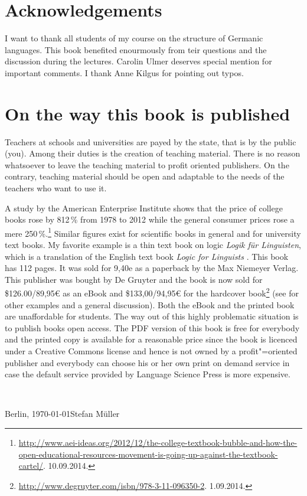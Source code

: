 \section*{Acknowledgements}

I want to thank all students of my course on the structure of Germanic languages. This book
benefited enourmously from teir questions and the discussion during the lectures. 
Carolin Ulmer %
deserves special mention for important comments. I thank Anne
Kilgus for pointing out typos.


\section*{On the way this book is published}

Teachers at schools and universities are payed by the state, that is by the public (you). Among
their duties is the creation of teaching material. There is no reason whatsoever to leave the
teaching material to profit oriented publishers. On the contrary, teaching material should be open
and adaptable to the needs of the teachers who want to use it. 

A study by the American Enterprise Institute shows that the price of college books rose by 812\,\%
from 1978 to 2012 while the general consumer prices rose a mere 250\,\%.\footnote{
\url{http://www.aei-ideas.org/2012/12/the-college-textbook-bubble-and-how-the-open-educational-resources-movement-is-going-up-against-the-textbook-cartel/}.
10.09.2014.%
} Similar figures exist for scientific books in general and for university text books. My favorite example is a thin text book
on logic \emph{Logik für Linguisten}, which is a translation of the English text book \emph{Logic for
Linguists} \citep{AAD73a}. This book has 112 pages. It was sold for 9,40e as a paperback by the Max Niemeyer
Verlag. This publisher was bought by De Gruyter and the book is now sold for \$126.00/89,95€ as an
eBook and \$133,00/94,95€ for the hardcover book\footnote{
  \url{http://www.degruyter.com/isbn/978-3-11-096350-2}. 1.09.2014.
} (see \citealp{MuellerOA} for other examples and a general discussion). Both the eBook and the printed book are unaffordable for students. The way out of this highly
problematic situation is to publish books open access. The PDF version of this book is free for
everybody and the printed copy is available for a reasonable price since the book is licenced under
a Creative Commons license and hence is not owned by a
profit"=oriented publisher and everybody can choose his or her own print on demand service in case
the default service provided by Language Science Press is more expensive.

~\medskip

\noindent
Berlin, \today\hfill Stefan Müller
